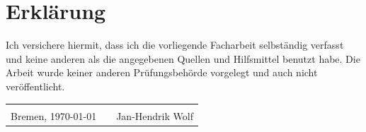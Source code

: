 \documentclass[a4paper,12pt,bibliography=totoc]{scrreprt}%
\begin{document}
\clearpage


\newpage
{}
\chapter*{Erklärung}
Ich versichere hiermit, dass ich die vorliegende Facharbeit selbständig verfasst und keine anderen als die angegebenen Quellen und Hilfsmittel benutzt habe. Die Arbeit wurde keiner anderen Prüfungsbehörde vorgelegt und auch nicht veröffentlicht.
\begin{center}
\begin{tabular}{lp{2em}l} 
 \hspace{5cm}   && \hspace{4cm} \\\cline{1-1}\cline{3-3} 
 Bremen, \today    && Jan-Hendrik Wolf 
\end{tabular} 
\end{center}
\end{document}
